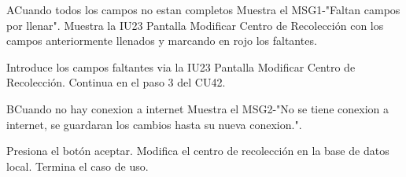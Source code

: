 \begin{UCtrayectoriaA}{A}{Cuando todos los campos no estan completos}
	\UCpaso Muestra el MSG1-"Faltan campos por llenar".
	\UCpaso Muestra la IU23 Pantalla Modificar Centro de Recolección con los campos anteriormente llenados y marcando en rojo los faltantes.
	\item\UCactor Introduce los campos faltantes via la IU23 Pantalla Modificar Centro de Recolección.
	\UCpaso Continua en el paso 3 del CU42.
\end{UCtrayectoriaA}

\begin{UCtrayectoriaA}{B}{Cuando no hay conexion a internet}
	\UCpaso Muestra el MSG2-"No se tiene conexion a internet, se guardaran los cambios hasta su nueva conexion.".
	\item\UCactor Presiona el botón aceptar.
	\UCpaso Modifica el centro de recolección en la base de datos local.	
	\UCpaso[] Termina el caso de uso.
\end{UCtrayectoriaA}